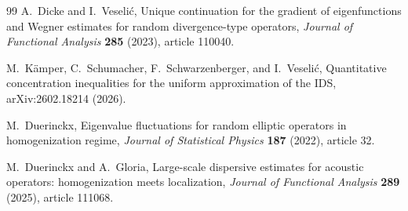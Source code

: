 \documentclass[11pt]{article}
\theoremstyle{definition}
\theoremstyle{remark}
\begin{document}
\begin{thebibliography}{99}
A.~Dicke and I.~Veseli\'c,
\newblock Unique continuation for the gradient of eigenfunctions and Wegner estimates for random divergence-type operators,
\newblock \emph{Journal of Functional Analysis} \textbf{285} (2023), article 110040.

M.~K\"amper, C.~Schumacher, F.~Schwarzenberger, and I.~Veseli\'c,
\newblock Quantitative concentration inequalities for the uniform approximation of the IDS,
\newblock arXiv:2602.18214 (2026).

M.~Duerinckx,
\newblock Eigenvalue fluctuations for random elliptic operators in homogenization regime,
\newblock \emph{Journal of Statistical Physics} \textbf{187} (2022), article 32.

M.~Duerinckx and A.~Gloria,
\newblock Large-scale dispersive estimates for acoustic operators: homogenization meets localization,
\newblock \emph{Journal of Functional Analysis} \textbf{289} (2025), article 111068.

\end{thebibliography}
\end{document}
